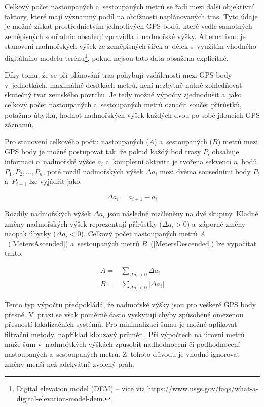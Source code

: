Celkový počet nastoupaných a~sestoupaných metrů se řadí mezi další objektivní faktory, které mají významný podíl na obtížnosti naplánovaných tras.
Tyto údaje je možné získat prostřednictvím jednotlivých GPS bodů, které vedle samotných zeměpisných souřadnic obsahují zpravidla i~nadmořské výšky.
Alternativou je stanovení nadmořských výšek ze zeměpisných šířek a~délek s~využitím vhodného digitálního modelu terénu\footnote{Digital elevation model (DEM) -- více viz \url{https://www.usgs.gov/faqs/what-a-digital-elevation-model-dem}.}, pokud nejsou tato data obsažena explicitně.

Díky tomu, že se při plánování tras pohybují vzdálenosti mezi GPS body v~jednotkách, maximálně desítkách metrů, není nezbytně nutné zohledňovat skutečný tvar zemského povrchu.
Je tedy možné výpočty zjednodušit a~jako celkový počet nastoupaných a~sestoupaných metrů označit součet přírůstků, potažmo úbytků, hodnot nadmořských výšek každých dvou po sobě jdoucích GPS záznamů.

Pro stanovení celkového počtu nastoupaných ($A$) a~sestoupaných ($B$) metrů mezi GPS body je možné postupovat tak, že pokud každý bod trasy $P_i$ obsahuje informaci o~nadmořské výšce $a_i$ a~kompletní aktivita je tvořena sekvencí $n$~bodů $P_1, P_2, \dots, P_n$, poté rozdíl nadmořských výšek $\Delta a_i$ mezi dvěma sousedními body $P_i$ a~$P_{i+1}$ lze vyjádřit jako:

\[
    \Delta a_i = a_{i+1} - a_i
\]

Rozdíly nadmořských výšek $\Delta a_i$ jsou následně rozčleněny na dvě skupiny.
Kladné změny nadmořských výšek reprezentují přírůstky ($\Delta a_i > 0$) a~záporné změny naopak úbytky ($\Delta a_i < 0$).
Celkový počet nastoupaných metrů $A$~(\ref{MetersAscended}) a~sestoupaných metrů $B$~(\ref{MetersDescended}) lze vypočítat takto:

\begin{align}
    A =& \sum_{\Delta a_i > 0} \Delta a_i \label{MetersAscended} \\
    B =& \sum_{\Delta a_i < 0} |\Delta a_i| \label{MetersDescended}
\end{align}

Tento typ výpočtu předpokládá, že nadmořské výšky jsou pro veškeré GPS body přesné.
V~praxi se však poměrně často vyskytují chyby způsobené omezenou přesností lokalizačních systémů.
Pro minimalizaci šumu je možné aplikovat filtrační metody, například klouzavý průměr \cite{OzdemirZeynep2019}.
Při výpočtech na úrovni metrů může šum v~nadmořských výškách způsobit nadhodnocení či podhodnocení nastoupaných a~sestoupaných metrů.
Z~tohoto důvodu je vhodné ignorovat změny menší než adekvátně zvolený práh.

